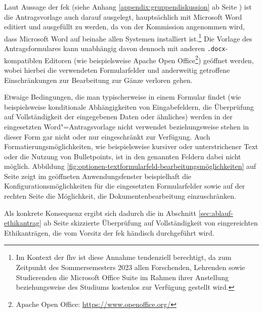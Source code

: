 \documentclass[a4paper,12pt,twoside]{scrreprt}
\begin{document}
Laut Aussage der \acl{fek} (siehe Anhang \ref{appendix:gruppendiskussion} ab Seite \pageref{appendix:gruppendiskussion}) ist die Antragsvorlage auch darauf ausgelegt, hauptsächlich mit Microsoft Word editiert und ausgefüllt zu werden, da von der Kommission angenommen wird, dass Microsoft Word auf beinahe allen Systemen installiert ist.\footnote{Im Kontext der \acl{fhv} ist diese Annahme tendenziell berechtigt, da zum Zeitpunkt des Sommersemesters 2023 allen Forschenden, Lehrenden sowie Studierenden die Microsoft Office Suite im Rahmen ihrer Anstellung beziehungsweise des Studiums kostenlos zur Verfügung gestellt wird.} Die Vorlage des Antragsformulares kann unabhängig davon dennoch mit anderen \texttt{.docx}-kompatiblen Editoren (wie beispielsweise Apache Open Office\footnote{Apache Open Office: \url{https://www.openoffice.org/}}) geöffnet werden, wobei hierbei die verwendeten Formularfelder und anderweitig getroffene Einschränkungen zur Bearbeitung zur Gänze verloren gehen.

Etwaige Bedingungen, die man typischerweise in einem Formular findet (wie beispielsweise konditionale Abhängigkeiten von Eingabefeldern, die Überprüfung auf Vollständigkeit der eingegebenen Daten oder ähnliches) werden in der eingesetzten Word"=Antragsvorlage nicht verwendet beziehungsweise stehen in dieser Form gar nicht oder nur eingeschränkt zur Verfügung. Auch Formatierungsmöglichkeiten, wie beispielsweise kursiver oder unterstrichener Text oder die Nutzung von Bulletpoints, ist in den genannten Feldern dabei nicht möglich.
Abbildung \ref{fig:optionen-textformularfeld-bearbeitungsmöglichkeiten} auf Seite \pageref{fig:optionen-textformularfeld-bearbeitungsmöglichkeiten} zeigt im geöffneten Anwendungsfenster beispielhaft die Konfigurationsmöglichkeiten für die eingesetzten Formularfelder sowie auf der rechten Seite die Möglichkeit, die Dokumentenbearbeitung einzuschränken.

Als konkrete Konsequenz ergibt sich dadurch die in Abschnitt \ref{sec:ablauf-ethikantrag} ab Seite \pageref{sec:ablauf-ethikantrag} skizzierte Überprüfung auf Vollständigkeit von eingereichten Ethikanträgen, die vom Vorsitz der \ac{fek} händisch durchgeführt wird.
\end{document}
